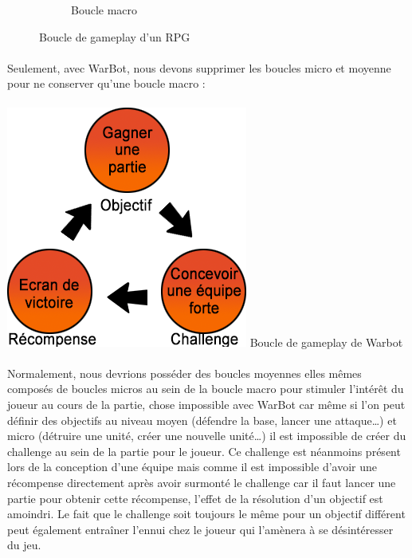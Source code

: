 \documentclass{report}
\begin{document}
\begin{figure}
\begin{adjustwidth}{-8em}{-7em}
\begin{subfigure}{.5\textwidth}
  \caption{Boucle macro}
  \label{fig:sfig3}
\end{subfigure}
\caption{Boucle de gameplay d'un RPG}
\label{fig:fig}
\end{adjustwidth}
\end{figure}
\paragraph{}
\newpage
Seulement, avec WarBot, nous devons supprimer les boucles micro et moyenne pour ne conserver qu’une boucle macro :

\paragraph{}
\begin{center}
\includegraphics[scale=0.7]{DATA/macroWarBot.png}
 {Boucle de gameplay de Warbot}
\end{center}
\paragraph{}

Normalement, nous devrions posséder des boucles moyennes elles mêmes composés de boucles micros au sein de la boucle macro pour stimuler l’intérêt du joueur au cours de la partie, chose impossible avec WarBot car même si l’on peut définir des objectifs au niveau moyen (défendre la base, lancer une attaque…) et micro (détruire une unité, créer une nouvelle unité…) il est impossible de créer du challenge au sein de la partie pour le joueur. Ce challenge est néanmoins présent lors de la conception d’une équipe mais comme il est impossible d’avoir une récompense directement après avoir surmonté le challenge car il faut lancer une partie pour obtenir cette récompense, l’effet de la résolution d’un objectif est amoindri. Le fait que le challenge soit toujours le même pour un objectif différent peut également entraîner l’ennui chez le joueur qui l’amènera à se désintéresser du jeu.
\end{document}
